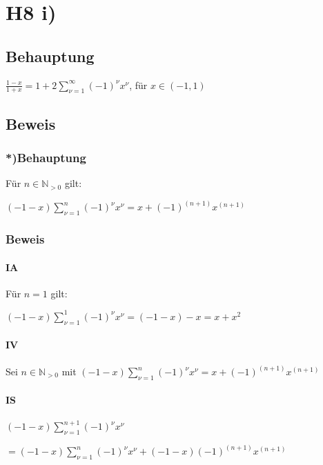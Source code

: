 \section*{H8 i)}

\subsection*{Behauptung}

$ \frac{1-x}{1+x} = 1 + 2 \sum\limits_{\nu=1}^{\infty} (-1)^{\nu} x^{\nu}$, für $x \in (-1,1) $

\subsection*{Beweis}

\subsubsection*{*)Behauptung}

Für $n \in \mathbb{N}_{>0}$ gilt:

$(-1-x)\sum\limits^{n}_{\nu=1}(-1)^{\nu}x^{\nu} = x+(-1)^{(n+1)}x^{(n+1)}$

\subsubsection*{Beweis}

\paragraph*{IA}

Für $n = 1$ gilt:


$(-1-x)\sum\limits^{1}_{\nu=1}(-1)^{\nu}x^{\nu} =(-1-x)-x= x+x^{2}$

\paragraph*{IV}

Sei $n \in \mathbb{N}_{>0}$ mit 
$(-1-x)\sum\limits^{n}_{\nu=1}(-1)^{\nu}x^{\nu} = x+(-1)^{(n+1)}x^{(n+1)}$

\paragraph*{IS}

$  (-1-x)\sum\limits^{n+1}_{\nu=1}(-1)^{\nu}x^{\nu} $

$ = (-1-x)\sum\limits^{n}_{\nu = 1}(-1)^{\nu} x^{\nu} + (-1-x) (-1)^{(n+1)} x^{(n+1)} $

